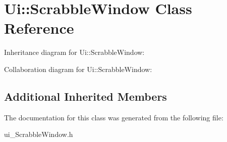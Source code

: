 \hypertarget{classUi_1_1ScrabbleWindow}{}\section{Ui\+:\+:Scrabble\+Window Class Reference}
\label{classUi_1_1ScrabbleWindow}


Inheritance diagram for Ui\+:\+:Scrabble\+Window\+:


Collaboration diagram for Ui\+:\+:Scrabble\+Window\+:
\subsection*{Additional Inherited Members}


The documentation for this class was generated from the following file\+:\begin{DoxyCompactItemize}
\item 
ui\+\_\+\+Scrabble\+Window.\+h\end{DoxyCompactItemize}
